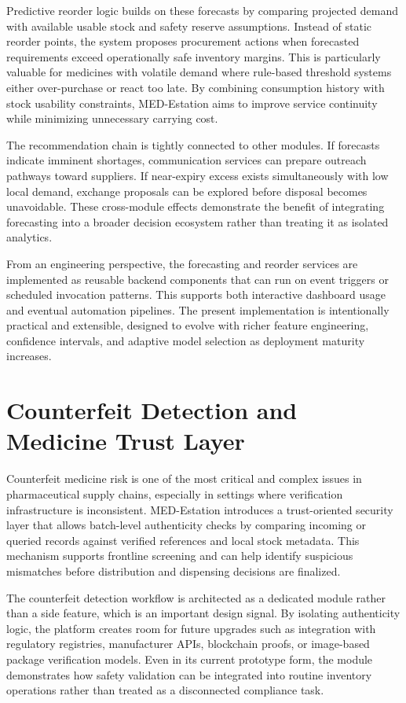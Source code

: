 \documentclass[12pt,a4paper]{report}
\begin{document}
Predictive reorder logic builds on these forecasts by comparing projected demand with available usable stock and safety reserve assumptions. Instead of static reorder points, the system proposes procurement actions when forecasted requirements exceed operationally safe inventory margins. This is particularly valuable for medicines with volatile demand where rule-based threshold systems either over-purchase or react too late. By combining consumption history with stock usability constraints, MED-Estation aims to improve service continuity while minimizing unnecessary carrying cost.

The recommendation chain is tightly connected to other modules. If forecasts indicate imminent shortages, communication services can prepare outreach pathways toward suppliers. If near-expiry excess exists simultaneously with low local demand, exchange proposals can be explored before disposal becomes unavoidable. These cross-module effects demonstrate the benefit of integrating forecasting into a broader decision ecosystem rather than treating it as isolated analytics.

From an engineering perspective, the forecasting and reorder services are implemented as reusable backend components that can run on event triggers or scheduled invocation patterns. This supports both interactive dashboard usage and eventual automation pipelines. The present implementation is intentionally practical and extensible, designed to evolve with richer feature engineering, confidence intervals, and adaptive model selection as deployment maturity increases.

\chapter{Counterfeit Detection and Medicine Trust Layer}
Counterfeit medicine risk is one of the most critical and complex issues in pharmaceutical supply chains, especially in settings where verification infrastructure is inconsistent. MED-Estation introduces a trust-oriented security layer that allows batch-level authenticity checks by comparing incoming or queried records against verified references and local stock metadata. This mechanism supports frontline screening and can help identify suspicious mismatches before distribution and dispensing decisions are finalized.

The counterfeit detection workflow is architected as a dedicated module rather than a side feature, which is an important design signal. By isolating authenticity logic, the platform creates room for future upgrades such as integration with regulatory registries, manufacturer APIs, blockchain proofs, or image-based package verification models. Even in its current prototype form, the module demonstrates how safety validation can be integrated into routine inventory operations rather than treated as a disconnected compliance task.
\end{document}
